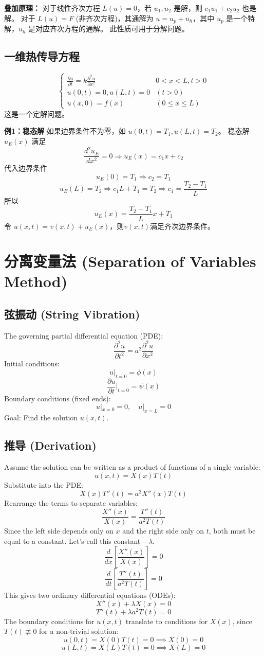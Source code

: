\documentclass{article}
\begin{document}
	\textbf{叠加原理：}
	对于线性齐次方程 $L(u)=0$，若 $u_1, u_2$ 是解，则 $c_1 u_1 + c_2 u_2$ 也是解。
	对于 $L(u) = F$ (非齐次方程)，其通解为 $u = u_p + u_h$，其中 $u_p$ 是一个特解，$u_h$ 是对应齐次方程的通解。
	此性质可用于分解问题。
	
	\subsection*{一维热传导方程}
	$$ \begin{cases}
		\frac{\partial u}{\partial t} = k \frac{\partial^2 u}{\partial x^2} & 0 < x < L, t>0 \\
		u(0,t)=0, u(L,t)=0 & (t>0) \\
		u(x,0)=f(x) & (0 \le x \le L)
	\end{cases} $$
	这是一个定解问题。
	
	\textbf{例1：稳态解}
	如果边界条件不为零，如 $u(0,t)=T_1, u(L,t)=T_2$。
	稳态解 $u_E(x)$ 满足
	$$ \frac{d^2 u_E}{d x^2} = 0 \Rightarrow u_E(x) = c_1 x + c_2 $$
	代入边界条件
	$$ u_E(0)=T_1 \Rightarrow c_2=T_1 $$
	$$ u_E(L)=T_2 \Rightarrow c_1 L + T_1 = T_2 \Rightarrow c_1 = \frac{T_2-T_1}{L} $$
	所以
	$$ u_E(x) = \frac{T_2-T_1}{L}x + T_1 $$
	令 $u(x,t) = v(x,t) + u_E(x)$，则$v(x,t)$满足齐次边界条件。
	
	\section*{分离变量法 (Separation of Variables Method)}
	\subsection*{弦振动 (String Vibration)}
	
	\noindent The governing partial differential equation (PDE):
	$$ \frac{\partial^2 u}{\partial t^2} = a^2 \frac{\partial^2 u}{\partial x^2} $$
	Initial conditions:
	$$ u|_{t=0} = \phi(x) $$
	$$ \frac{\partial u}{\partial t}\bigg|_{t=0} = \psi(x) $$
	Boundary conditions (fixed ends):
	$$ u|_{x=0} = 0, \quad u|_{x=L} = 0 $$
	Goal: Find the solution $u(x,t)$.
	
	\subsection*{推导 (Derivation)}
	Assume the solution can be written as a product of functions of a single variable:
	$$ u(x,t) = X(x)T(t) $$
	Substitute into the PDE:
	$$ X(x)T''(t) = a^2 X''(x)T(t) $$
	Rearrange the terms to separate variables:
	$$ \frac{X''(x)}{X(x)} = \frac{T''(t)}{a^2 T(t)} $$
	Since the left side depends only on $x$ and the right side only on $t$, both must be equal to a constant. Let's call this constant $-\lambda$.
	$$ \frac{d}{dx}\left[\frac{X''(x)}{X(x)}\right] = 0 $$
	$$ \frac{d}{dt}\left[\frac{T''(t)}{a^2 T(t)}\right] = 0 $$
	This gives two ordinary differential equations (ODEs):
	$$ X''(x) + \lambda X(x) = 0 $$
	$$ T''(t) + \lambda a^2 T(t) = 0 $$
	The boundary conditions for $u(x,t)$ translate to conditions for $X(x)$, since $T(t) \not\equiv 0$ for a non-trivial solution:
	$$ u(0,t) = X(0)T(t) = 0 \implies X(0) = 0 $$
	$$ u(L,t) = X(L)T(t) = 0 \implies X(L) = 0 $$
	
\end{document}
